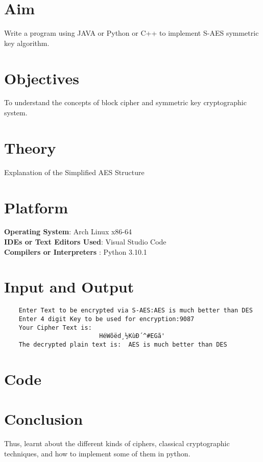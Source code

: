 \documentclass[11pt]{article}
\begin{document}
\tableofcontents
\thispagestyle{empty}
\clearpage

\setcounter{page}{1}

\section{Aim}
Write a program using JAVA or Python or C++ to implement S-AES symmetric key
algorithm.

\section{Objectives}
To understand the concepts of block cipher and symmetric key cryptographic
system.

\section{Theory}

Explanation of the Simplified AES Structure

\section{Platform}
\textbf{Operating System}: Arch Linux x86-64 \\
\textbf{IDEs or Text Editors Used}: Visual Studio Code\\
\textbf{Compilers or Interpreters} : Python 3.10.1\\

\section{Input and Output}
\begin{verbatim}
    Enter Text to be encrypted via S-AES:AES is much better than DES
    Enter 4 digit Key to be used for encryption:9087
    Your Cipher Text is:  
                          HéWõëd¸½KùÐ´^#EGã'
    The decrypted plain text is:  AES is much better than DES
\end{verbatim}
\section{Code}


\section{Conclusion}
Thus, learnt about the different kinds of ciphers, classical cryptographic techniques, and how to implement some of them in python.
\clearpage
\end{document}
